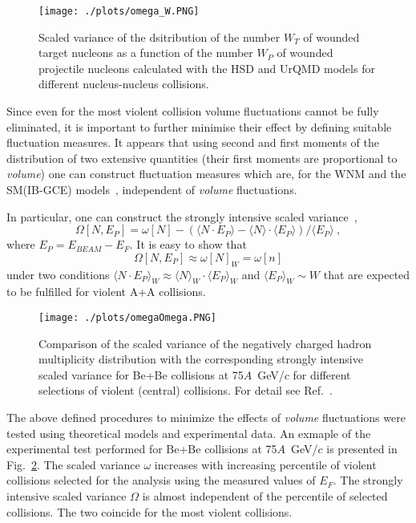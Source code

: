 \documentclass{PoS}
\begin{document}
\begin{figure}[h]
	\centering
	\texttt{[image: ./plots/omega\_W.PNG]}
	\caption[]
	{
		Scaled variance of the dsitribution of the number $W_T$ of wounded target nucleons as a 
                function of the number $W_P$ of wounded projectile 
		nucleons calculated with the HSD and UrQMD models for different nucleus-nucleus collisions. 
	}
	\label{fig:omega_W}
\end{figure}


Since even for the most violent collision volume fluctuations 
cannot be fully eliminated, it is important
to further minimise their effect by defining suitable fluctuation measures.
It appears that using second and first moments of the distribution of two extensive
quantities 
(their first moments are proportional to  \textit{volume})
one can construct fluctuation measures which are, 
for the WNM and the SM(IB-GCE) models~\cite{mgsm,siq,sangaline},
independent of \textit{volume} fluctuations.

In particular, one can construct the strongly intensive scaled variance~\cite{siq},
\begin{equation}
\Omega[N,E_P] = \omega[N] - ( \langle N \cdot E_P \rangle - \langle N \rangle \cdot \langle E_P \rangle ) / 
\langle E_P \rangle~,  
\label{eq:Omega}
\end{equation}
where $E_P = E_{BEAM} - E_F$.
It is easy to show that
\begin{equation}
\Omega[N,E_P] \approx \omega[N]_W = \omega[n]
\end{equation}
under two conditions $\langle N \cdot E_P \rangle_W \approx \langle N \rangle_W \cdot \langle E_P \rangle_W$ and
$\langle E_P \rangle_W \sim W$ that are expected to be fulfilled for violent A+A collisions.  


\begin{figure}[h]
	\centering
	\texttt{[image: ./plots/omegaOmega.PNG]}
	\caption[]
	{
		Comparison of the scaled variance of the negatively charged hadron multiplicity distribution with the corresponding
		strongly intensive scaled variance for Be+Be collisions at 75$A$~GeV/$c$ for different selections of violent
		(central) collisions. For detail see Ref.~\cite{cpod-seryakov}.
	}
	\label{fig:omega.Omega}
\end{figure}

The above defined procedures to minimize the effects of \textit{volume} fluctuations were tested using theoretical models and
experimental data. An exmaple of the experimental test performed for Be+Be collisions at 75$A$~GeV/$c$ is presented in Fig.~\ref{fig:omega.Omega}. The scaled variance $\omega$ increases with increasing percentile of violent collisions selected 
for the analysis using the measured values of $E_F$.
The strongly intensive scaled variance $\Omega$ is almost independent of the percentile of selected collisions. 
The two coincide for the most violent collisions.
\end{document}
